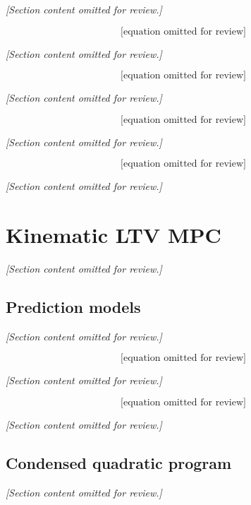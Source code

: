\textit{[Section content omitted for review.]}

\begin{equation}
\text{[equation omitted for review]}
\label{eq:app_cc_lqr_fwd}
\end{equation}

\textit{[Section content omitted for review.]}

\begin{equation}
\text{[equation omitted for review]}
\label{eq:app_cc_lqr_rev}
\end{equation}

\textit{[Section content omitted for review.]}

\begin{equation}
\text{[equation omitted for review]}
\label{eq:app_cc_lqr_gain}
\end{equation}

\textit{[Section content omitted for review.]}

\begin{equation}
\text{[equation omitted for review]}
\label{eq:app_cc_lqr_cmd}
\end{equation}

\textit{[Section content omitted for review.]}

\section{Kinematic LTV MPC}
\label{sec:app_cc_mpc}
\textit{[Section content omitted for review.]}

\subsection{Prediction models}
\textit{[Section content omitted for review.]}

\begin{equation}
\text{[equation omitted for review]}
\label{eq:app_cc_mpc_rev}
\end{equation}

\textit{[Section content omitted for review.]}

\begin{equation}
\text{[equation omitted for review]}
\label{eq:app_cc_mpc_inner}
\end{equation}

\textit{[Section content omitted for review.]}

\subsection{Condensed quadratic program}
\textit{[Section content omitted for review.]}

